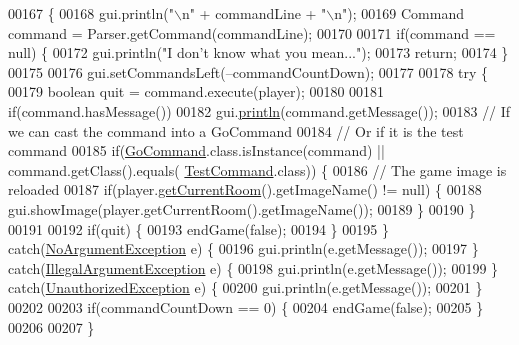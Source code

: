 \begin{DoxyCode}
00167                                                    \{
00168         gui.println(\textcolor{stringliteral}{"\(\backslash\)n"} + commandLine + \textcolor{stringliteral}{"\(\backslash\)n"});
00169         Command command = Parser.getCommand(commandLine);
00170 
00171         \textcolor{keywordflow}{if}(command == null) \{
00172             gui.println(\textcolor{stringliteral}{"I don't know what you mean..."});
00173             \textcolor{keywordflow}{return};
00174         \}
00175 
00176         gui.setCommandsLeft(--commandCountDown);
00177 
00178         \textcolor{keywordflow}{try} \{
00179             \textcolor{keywordtype}{boolean} quit = command.execute(player);
00180 
00181             \textcolor{keywordflow}{if}(command.hasMessage())
00182                 gui.\hyperlink{classUserInterface_a79f606b4b1f5d1523e50eea00039ed94}{println}(command.getMessage());
00183             \textcolor{comment}{// If we can cast the command into a GoCommand}
00184             \textcolor{comment}{// Or if it is the test command}
00185             \textcolor{keywordflow}{if}(\hyperlink{classGoCommand}{GoCommand}.class.isInstance(command) || command.getClass().equals(
      \hyperlink{classTestCommand}{TestCommand}.class)) \{
00186                 \textcolor{comment}{// The game image is reloaded}
00187                 \textcolor{keywordflow}{if}(player.\hyperlink{classPlayer_a3a3107df50fc4e35e8c0f46c3f776ce6}{getCurrentRoom}().getImageName() != null) \{
00188                     gui.showImage(player.getCurrentRoom().getImageName());
00189                 \}
00190             \}
00191 
00192             \textcolor{keywordflow}{if}(quit) \{
00193                 endGame(\textcolor{keyword}{false});
00194             \}
00195         \} \textcolor{keywordflow}{catch}(\hyperlink{classNoArgumentException}{NoArgumentException} e) \{
00196             gui.println(e.getMessage());
00197         \} \textcolor{keywordflow}{catch}(\hyperlink{classIllegalArgumentException}{IllegalArgumentException} e) \{
00198             gui.println(e.getMessage());
00199         \} \textcolor{keywordflow}{catch}(\hyperlink{classUnauthorizedException}{UnauthorizedException} e) \{
00200             gui.println(e.getMessage());
00201         \}
00202 
00203         \textcolor{keywordflow}{if}(commandCountDown == 0) \{
00204             endGame(\textcolor{keyword}{false});
00205         \}
00206 
00207     \}
\end{DoxyCode}


